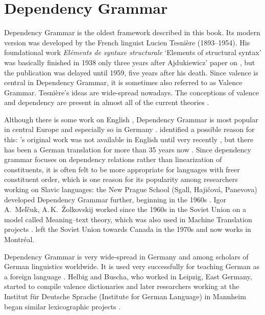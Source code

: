 \chapter{Dependency Grammar}
\label{Kapitel-DG}


Dependency Grammar is the oldest framework described in this book. Its modern version was developed by the
French linguist Lucien Tesnière (1893--1954). His foundational work \emph{Eléments de syntaxe
  structurale} `Elements of structural syntax' was basically finished in 1938 only three years after
Ajdukiewicz' paper on \cg \citeyearpar{Ajdukiewicz35a-u}, but the publication
was delayed until 1959, five years after his death\nocite{Tesniere59a-u}. Since valence is central
in Dependency Grammar, it is sometimes also referred to as Valence Grammar. 
Tesnière's ideas are wide-spread nowadays. The conceptions of valence and dependency are present in
almost all of the current theories \citep[--263, 284]{AF2010a}.

Although there is some work on English \citep{Anderson71a-u,Hudson84a-u}, Dependency Grammar is most popular in central Europe and especially so in Germany \citep[--57]{Engel96a}. \citet[]{AF2010a} identified a possible reason for this: \tes's
original work was not available in English until very recently \citep{Tesniere2015a-u}, but there has
been a German translation for more than 35 years now \citep{Tesniere80a-u}. Since dependency grammar focuses on dependency relations rather than
linearization of constituents, it is often felt to be more appropriate for languages with freer
constituent order, which is one reason for its popularity among researchers working on Slavic
languages: the New Prague School (Sgall, Hajičová, Panevova) developed Dependency Grammar further,
beginning in the 1960s \citep{HS2003a-u}.  Igor\,A.\ Meľčuk, A.\,K.\ Žolkovskij worked since the 1960s
in the Soviet Union on a model called Meaning–text theory, which was also used in Machine
Translation projects \citep{Melcuk64a-u,Melcuk81a,Melcuk88a-u,Kahane2003a-u}. \mel left the
Soviet Union towards Canada in the 1970s and now works in Montréal. 


Dependency Grammar is very wide-spread in Germany and among scholars of German linguistics
worldwide. It is used very successfully for teaching German as a foreign language
\citep{HB69a-u,HB98a}. Helbig and Buscha, who worked in Leipzig, East Germany, started to
compile valence dictionaries \citep{HS69a-u} and later researchers working at the Institut für
Deutsche Sprache (Institute for German Language) in Mannheim began similar lexicographic projects \citep{SKSR2004a-u}. 

